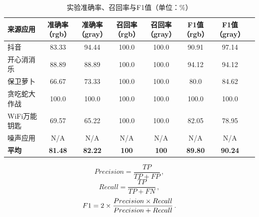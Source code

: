 \begin{table}[htbp]
    \renewcommand{\arraystretch}{1}
    \footnotesize
    \centering
    \caption{实验准确率、召回率与F1值（单位：\%）}
    \vspace{1mm}
    \begin{tabular}{l ccccccc}
        \toprule
        \bf{来源应用}                  & \makecell[c]{准确率                                                                   \\（rgb）} & \makecell[c]{准确率\\（gray）} & \makecell[c]{召回率\\（rgb）} & \makecell[c]{召回率\\（gray）} & \makecell[c]{F1值\\（rgb）} & \makecell[c]{F1值\\（gray）} \\
        \midrule
        抖音                           & 83.33               & 94.44       & 100.0     & 100.0     & 90.91       & 97.14       \\
        \rowcolor{gray!15}开心消消乐   & 88.89               & 88.89       & 100.0     & 100.0     & 94.12       & 94.12       \\
        保卫萝卜                       & 66.67               & 73.33       & 100.0     & 100.0     & 80.0        & 84.62       \\
        \rowcolor{gray!15}贪吃蛇大作战 & 100.0               & 100.0       & 100.0     & 100.0     & 100.0       & 100.0       \\
        WiFi万能钥匙                   & 69.57               & 65.22       & 100.0     & 100.0     & 82.05       & 78.95       \\
        \rowcolor{gray!15}噪声应用     & N/A                 & N/A         & N/A       & N/A       & N/A         & N/A         \\
        {\bf 平均}                     & {\bf 81.48}         & {\bf 82.22} & {\bf 100} & {\bf 100} & {\bf 89.80} & {\bf 90.24} \\
        \bottomrule
    \end{tabular}
    \label{table:exp_1_accuracy_etc}
    \vspace{-3mm}
\end{table}

\begin{equation}
    Precision = \frac{TP}{TP+FP} \,,
    \label{equ:precision}
\end{equation}
\begin{equation}
    Recall = \frac{TP}{TP+FN} \,,
    \label{equ:recall}
\end{equation}
\begin{equation}
    F1 = 2\times \frac{Precision \times Recall}{Precision + Recall} \,.
    \label{equ:f1}
    \vspace{5mm}
\end{equation}


